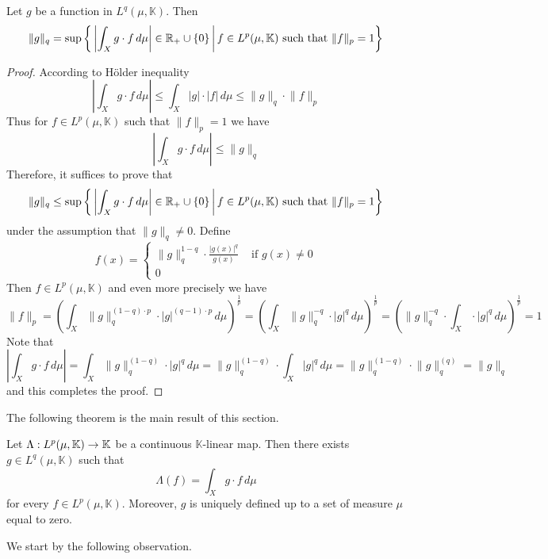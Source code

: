 \begin{proposition}\label{proposition:norm_of_standard_functional_for_positive_p}
  Let $g$ be a function in $L^q(\mu,\mathbb{K})$. Then
  $$\lVert g\rVert_q = \sup \bigg\{\left|\int_X g\cdot f\,d\mu\right|\in {\mathbb R}_+\cup \{0\}\,\bigg|\,f\in L^p(\mu,\mathbb{K})\mbox{ such that }\lVert f\rVert_p = 1\bigg\}$$
\end{proposition}
\begin{proof}
  According to H{\"o}lder inequality
  $$\left|\int_X g\cdot f\,d\mu\right| \leq \int_X |g|\cdot |f|\,d\mu \leq \lVert g\rVert_q \cdot \lVert f\rVert_p$$
  Thus for $f \in L^p(\mu,\mathbb{K})$ such that $\lVert f\rVert_p = 1$ we have
  $$\left|\int_X g\cdot f\,d\mu\right| \leq \lVert g\rVert_q$$
  Therefore, it suffices to prove that
  $$\lVert g\rVert_q \leq \sup \bigg\{\left|\int_X g\cdot f\,d\mu\right|\in {\mathbb R}_+\cup \{0\}\,\bigg|\,f\in L^p(\mu,\mathbb{K})\mbox{ such that }\lVert f\rVert_p = 1\bigg\}$$
  under the assumption that $\lVert g \rVert_q \neq 0$. Define
  $$f(x) = \begin{cases}
      \lVert g \rVert_q^{1 - q}\cdot \frac{|g(x)|^q}{g(x)} & \mbox{ if }g(x) \neq 0 \\
      0
    \end{cases}
  $$
  Then $f \in L^p(\mu,\mathbb{K})$ and even more precisely we have
  $$\lVert f \rVert_p = \left(\int_X\lVert g \rVert_q^{(1 - q)\cdot p}\cdot |g|^{(q-1)\cdot p}\,d\mu\right)^{\frac{1}{p}} = \left(\int_X\lVert g \rVert_q^{-q}\cdot |g|^{q}\,d\mu\right)^{\frac{1}{p}} = \left(\lVert g \rVert_q^{-q}\cdot \int_X\cdot |g|^{q}\,d\mu\right)^{\frac{1}{p}} = 1
  $$
  Note that
  $$\left|\int_X g\cdot f\,d\mu\right| = \int_X \lVert g \rVert_q^{(1 - q)}\cdot |g|^{q}\,d\mu = \lVert g \rVert_q^{(1 - q)}\cdot \int_X |g|^{q}\,d\mu = \lVert g \rVert_q^{(1 - q)}\cdot \lVert g \rVert_q^{(q)} = \lVert g \rVert_q $$
  and this completes the proof.
\end{proof}
\noindent
The following theorem is the main result of this section.

\begin{theorem}\label{theorem:dual_to_L_p_for_p_in_(1_00)}
  Let $\Lambda:L^p(\mu,\mathbb{K})\rightarrow \mathbb{K}$ be a continuous $\mathbb{K}$-linear map. Then there exists $g \in L^q(\mu,\mathbb{K})$ such that
  $$\Lambda(f) = \int_Xg\cdot f\,d\mu$$
  for every $f \in L^p(\mu,\mathbb{K})$. Moreover, $g$ is uniquely defined up to a set of measure $\mu$ equal to zero.
\end{theorem}
\noindent
We start by the following observation.

